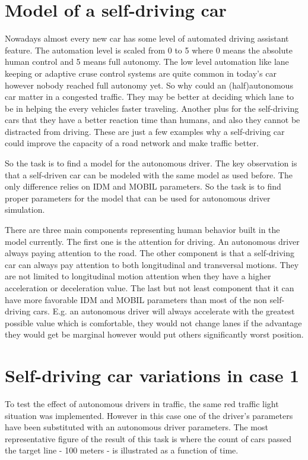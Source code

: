 	\section{Model of a self-driving car}
		Nowadays almost every new car has some level of automated driving assistant feature. The automation level is scaled from 0 to 5 where 0 means the absolute human control and 5 means full autonomy. The low level automation like lane keeping or adaptive cruse control systems are quite common in today's car however nobody reached full autonomy yet. So why could an (half)autonomous car matter in a congested traffic. They may be better at deciding which lane to be in helping the every vehicles faster traveling. Another plus for the self-driving cars that they have a better reaction time than humans, and also they cannot be distracted from driving. These are just a few examples why a self-driving car could improve the capacity of a road network and make traffic better.
		
		So the task is to find a model for the autonomous driver. The key observation is that a self-driven car can be modeled with the same model as used before. The only difference relies on IDM and MOBIL parameters. So the task is to find proper parameters for the model that can be used for autonomous driver simulation.
	
		There are three main components representing human behavior built in the model currently. The first one is the attention for driving. An autonomous driver always paying attention to the road. The other component is that a self-driving car can always pay attention to both longitudinal and transversal motions. They are not limited to longitudinal motion attention when they have a higher acceleration or deceleration value. The last but not least component that it can have more favorable IDM and MOBIL parameters than most of the non self-driving cars. E.g. an autonomous driver will always accelerate with the greatest possible value which is comfortable, they would not change lanes if the advantage they would get be marginal however would put others significantly worst position.
	\section{Self-driving car variations in case 1}
		To test the effect of autonomous drivers in traffic, the same red traffic light situation was implemented. However in this case one of the driver's parameters have been substituted with an autonomous driver parameters. The most representative figure of the result of this task is where the count of cars passed the target line - 100 meters - is illustrated as a function of time. 
